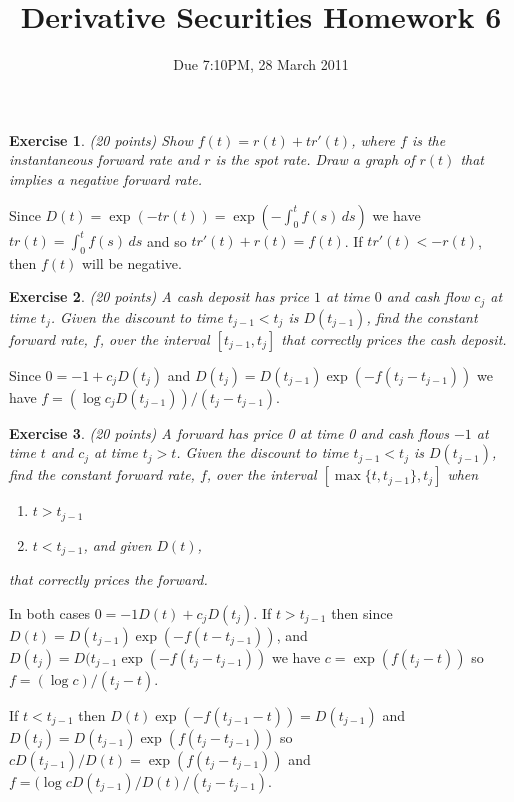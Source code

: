 \documentclass[11pt,fleqn]{amsproc}
\newtheorem{xca}{Exercise}
\begin{document}
\title{Derivative Securities Homework 6}
\author{Due 7:10PM, 28 March 2011}

\maketitle


\begin{xca}{(20 points)}
Show $f(t) = r(t) + t r'(t)$, where $f$ is the instantaneous forward rate and
$r$ is the spot rate. Draw a graph of $r(t)$ that implies a
negative forward rate.
\end{xca}

Since $D(t) = \exp(-tr(t)) = \exp(-\int_0^t f(s)\,ds)$ we have
$tr(t) = \int_0^t f(s)\,ds$ and so $tr'(t) + r(t) = f(t)$.
If $tr'(t) < -r(t)$, then $f(t)$ will be negative.

\begin{xca}{(20 points)}
A cash deposit has price $1$ at time $0$ and cash flow $c_j$
at time $t_j$.
Given the discount to time $t_{j-1} < t_j$ is $D(t_{j-1})$, find the
constant forward rate, $f$,
over the interval $[t_{j-1}, t_j]$ that correctly prices the cash deposit.
\end{xca}

Since $0 = -1 + c_jD(t_j)$ and $D(t_j) = D(t_{j-1})\exp(-f(t_j - t_{j-1}))$
we have $f = (\log c_jD(t_{j-1}))/(t_j - t_{j - 1})$.

\begin{xca}{(20 points)}
A forward has price 0 at time 0 and cash flows $-1$ at time $t$ and
$c_j$ at time $t_j > t$. Given the discount to time $t_{j-1} < t_j$ is
$D(t_{j-1})$, find the constant forward rate, $f$, over the interval
$[\max\{t, t_{j-1}\}, t_j]$ when

\begin{enumerate}
\item $t > t_{j-1}$
\item $t < t_{j-1}$, and given $D(t)$,
\end{enumerate}
that correctly prices the forward.

\end{xca}

In both cases $0 = -1D(t) + c_jD(t_j)$.
If $t > t_{j-1}$ then since
$D(t) = D(t_{j-1})\exp(-f(t - t_{j-1}))$, and
$D(t_j) = D(t_{j-1}\exp(-f(t_j - t_{j-1}))$ we have
$c = \exp(f(t_j - t))$
so $f = (\log c)/(t_j - t)$.

If $t < t_{j - 1}$ then $D(t)\exp(-f(t_{j-1} - t)) = D(t_{j-1})$
and $D(t_j) = D(t_{j-1})\exp(f(t_j - t_{j-1}))$ so
$cD(t_{j-1})/D(t) = \exp(f(t_j - t_{j-1}))$
and $f = (\log cD(t_{j-1})/D(t)/(t_j - t_{j-1})$.
\end{document}
